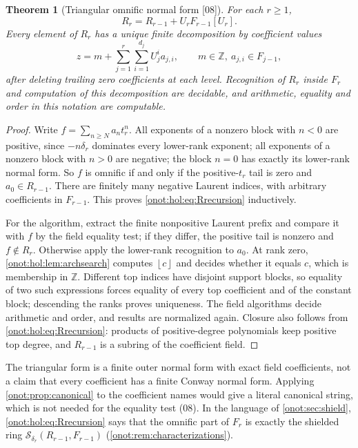 \documentclass[11pt,oneside]{article}
\numberwithin{equation}{section}
\newtheorem{theorem}{Theorem}[section]
\theoremstyle{definition}
\theoremstyle{remark}
\newcommand{\Z}{\mathbb Z}
\newcommand{\floor}[1]{\left\lfloor #1\right\rfloor}
\newcommand{\src}[1]{\textup{\textsf{\small[#1]}}}
\begin{document}
\begin{theorem}[Triangular omnific normal form \src{08}]\label{onot:hol:thm:triangular}
For each $r\ge1$,
\begin{equation}\label{onot:hol:eq:Rrecursion}
 R_r=R_{r-1}+U_rF_{r-1}[U_r].
\end{equation}
Every element of $R_r$ has a unique finite decomposition by coefficient values
\begin{equation}\label{onot:hol:eq:triangular}
 z=m+\sum_{j=1}^r\sum_{i=1}^{d_j}U_j^ia_{j,i},\qquad m\in\Z,\ a_{j,i}\in F_{j-1},
\end{equation}
after deleting trailing zero coefficients at each level. Recognition of $R_r$
inside $F_r$ and computation of this decomposition are decidable, and
arithmetic, equality and order in this notation are computable.
\end{theorem}
\begin{proof}
Write $f=\sum_{n\ge N}a_nt_r^n$. All exponents of a nonzero block with $n<0$ are
positive, since $-n\delta_r$ dominates every lower-rank exponent; all exponents of
a nonzero block with $n>0$ are negative; the block $n=0$ has exactly its
lower-rank normal form. So $f$ is omnific if and only if the positive-$t_r$ tail
is zero and $a_0\in R_{r-1}$. There are finitely many negative Laurent indices,
with arbitrary coefficients in $F_{r-1}$. This proves \eqref{onot:hol:eq:Rrecursion}
inductively.

For the algorithm, extract the finite nonpositive Laurent prefix and compare it
with $f$ by the field equality test; if they differ, the positive tail is nonzero
and $f\notin R_r$. Otherwise apply the lower-rank recognition to $a_0$. At rank
zero, \cref{onot:hol:lem:archsearch} computes $\floor c$ and decides whether it
equals $c$, which is membership in $\Z$. Different top indices have disjoint
support blocks, so equality of two such expressions forces equality of every top
coefficient and of the constant block; descending the ranks proves uniqueness.
The field algorithms decide arithmetic and order, and results are normalized
again. Closure also follows from \eqref{onot:hol:eq:Rrecursion}: products of
positive-degree polynomials keep positive top degree, and $R_{r-1}$ is a subring
of the coefficient field.
\end{proof}

The triangular form is a finite outer normal form with exact field coefficients,
not a claim that every coefficient has a finite Conway normal form. Applying
\cref{onot:prop:canonical} to the coefficient names would give a literal
canonical string, which is not needed for the equality test (08). In the language
of \cref{onot:sec:shield}, \eqref{onot:hol:eq:Rrecursion} says that the omnific
part of $F_r$ is exactly the shielded ring
$\mathcal S_{\delta_r}(R_{r-1},F_{r-1})$ (\cref{onot:rem:characterizations}).
\end{document}
